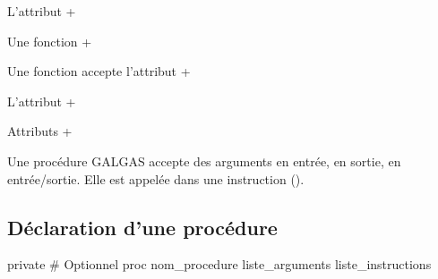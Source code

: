 L'attribut \ggst+%

Une fonction \ggst+%








Une fonction accepte l'attribut \ggst+%


L'attribut \ggst+%

Attributs \ggst+%







Une procédure GALGAS accepte des arguments en entrée, en sortie, en entrée/sortie. Elle est appelée dans une instruction ().

\subsection{Déclaration d'une procédure}

\begin{galgas3}
private # Optionnel
proc nom_procedure liste_arguments {
  liste_instructions
}
\end{galgas3}

